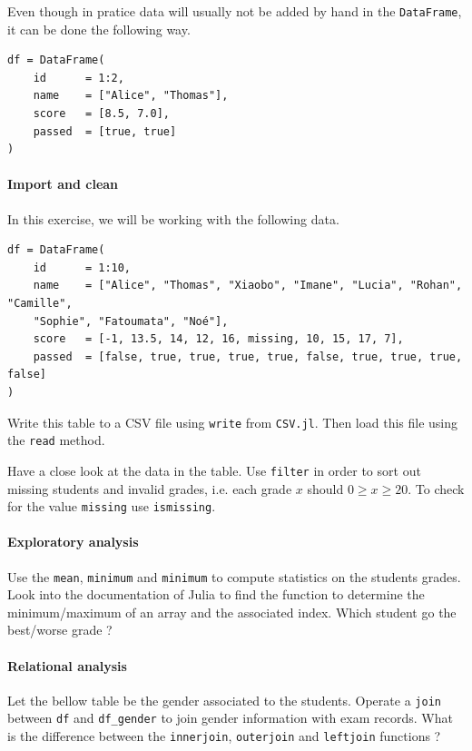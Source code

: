 \documentclass{article}
\begin{document}
\medskip
\noindent
Even though in pratice data will usually not be added by hand in the \texttt{DataFrame}, it can be done the following way.

\begin{verbatim}
df = DataFrame(
    id      = 1:2,
    name    = ["Alice", "Thomas"],
    score   = [8.5, 7.0],
    passed  = [true, true]
)
\end{verbatim}

\paragraph{Import and clean}

\medskip
\noindent
In this exercise, we will be working with the following data.

\begin{verbatim}
df = DataFrame(
    id      = 1:10,
    name    = ["Alice", "Thomas", "Xiaobo", "Imane", "Lucia", "Rohan", "Camille", 
    "Sophie", "Fatoumata", "Noé"],
    score   = [-1, 13.5, 14, 12, 16, missing, 10, 15, 17, 7],
    passed  = [false, true, true, true, true, false, true, true, true, false]
)
\end{verbatim}

\medskip
\noindent
Write this table to a CSV file using \texttt{write} from \texttt{CSV.jl}. Then load this file using the \texttt{read} method.

\medskip
\noindent
Have a close look at the data in the table. Use \texttt{filter} in order to sort out missing students and invalid grades, i.e. each grade $x$ should $0 \ge x \ge 20$. To check for the value \texttt{missing} use \texttt{ismissing}. 

\paragraph{Exploratory analysis}

\medskip
\noindent
Use the \texttt{mean}, \texttt{minimum} and \texttt{minimum} to compute statistics on the students grades. Look into the documentation of Julia to find the function to determine the minimum/maximum of an array and the associated index. Which student go the best/worse grade ?

\paragraph{Relational analysis}

\medskip
\noindent
Let the bellow table be the gender associated to the students. Operate a \texttt{join} between \texttt{df} and \texttt{df\_gender} to join gender information with exam records. What is the difference between the \texttt{innerjoin}, \texttt{outerjoin} and \texttt{leftjoin} functions ?
\end{document}

